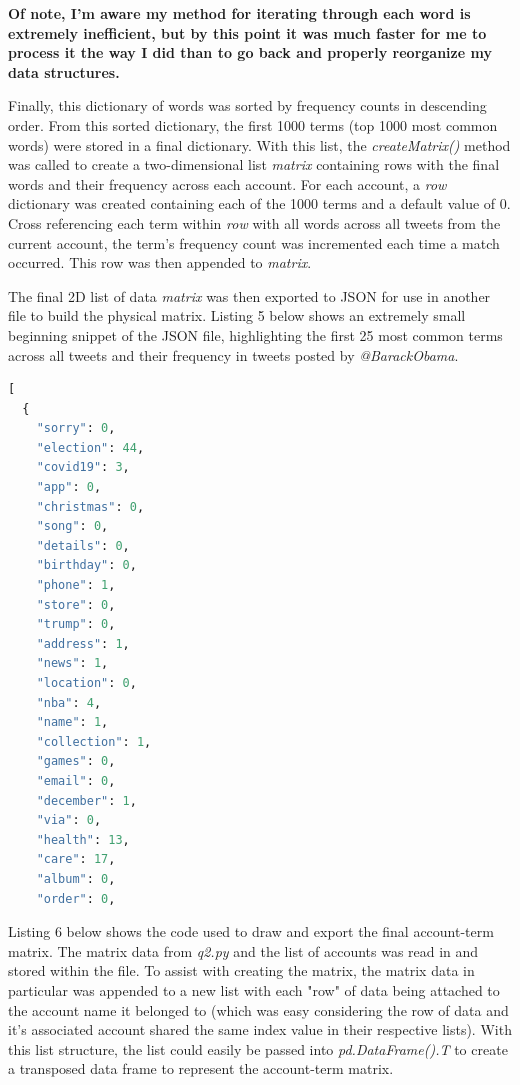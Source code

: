 \documentclass[12pt]{article}
\begin{document}
\textbf{Of note, I'm aware my method for iterating through each word is extremely inefficient, but by this point it was much faster for me to process it the way I did than to go back and properly reorganize my data structures.}

\par Finally, this dictionary of words was sorted by frequency counts in descending order. From this sorted dictionary, the first 1000 terms (top 1000 most common words) were stored in a final dictionary. With this list, the \emph{createMatrix()} method was called to create a two-dimensional list \emph{matrix} containing rows with the final words and their frequency across each account. For each account, a \emph{row} dictionary was created containing each of the 1000 terms and a default value of 0. Cross referencing each term within \emph{row} with all words across all tweets from the current account, the term's frequency count was incremented each time a match occurred. This row was then appended to \emph{matrix}.



\par The final 2D list of data \emph{matrix} was then exported to JSON for use in another file to build the physical matrix. Listing 5 below shows an extremely small beginning snippet of the JSON file, highlighting the first 25 most common terms across all tweets and their frequency in tweets posted by \emph{@BarackObama}.  

\begin{lstlisting}[language=Python, caption={First 25 terms for @BarackObama in MatrixData.json}, label=lst:copy]
[
  {
    "sorry": 0,
    "election": 44,
    "covid19": 3,
    "app": 0,
    "christmas": 0,
    "song": 0,
    "details": 0,
    "birthday": 0,
    "phone": 1,
    "store": 0,
    "trump": 0,
    "address": 1,
    "news": 1,
    "location": 0,
    "nba": 4,
    "name": 1,
    "collection": 1,
    "games": 0,
    "email": 0,
    "december": 1,
    "via": 0,
    "health": 13,
    "care": 17,
    "album": 0,
    "order": 0,
\end{lstlisting}

Listing 6 below shows the code used to draw and export the final account-term matrix. The matrix data from \emph{q2.py} and the list of accounts was read in and stored within the file. To assist with creating the matrix, the matrix data in particular was appended to a new list with each "row" of data being attached to the account name it belonged to (which was easy considering the row of data and it's associated account shared the same index value in their respective lists). With this list structure, the list could easily be passed into \emph{pd.DataFrame().T} to create a transposed data frame to represent the account-term matrix.
\end{document}
